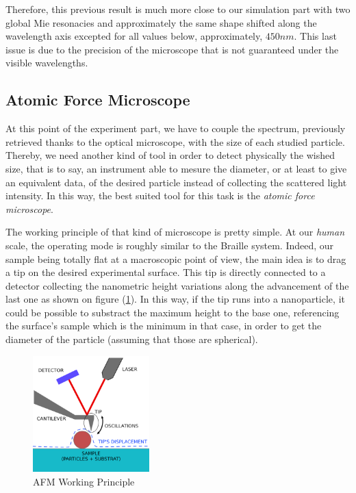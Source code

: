 \documentclass{article}
\numberwithin{equation}{section}
\begin{document}
Therefore, this previous result is much more close to our simulation part with two global Mie resonacies and approximately the same shape shifted along the wavelength axis excepted for all values below, approximately, $450 nm$. This last issue is due to the precision of the microscope that is not guaranteed under the visible wavelengths.

\subsection{Atomic Force Microscope}

At this point of the experiment part, we have to couple the spectrum, previously retrieved thanks to the optical microscope, with the size of each studied particle. Thereby, we need another kind of tool in order to detect physically the wished size, that is to say, an instrument able to mesure the diameter, or at least to give an equivalent data, of the desired particle instead of collecting the scattered light intensity. In this way, the best suited tool for this task is the \textit{atomic force microscope}.

The working principle of that kind of microscope is pretty simple. At our \textit{human} scale, the operating mode is roughly similar to the Braille system. Indeed, our sample being totally flat at a macroscopic point of view, the main idea is to drag a tip on the desired experimental surface. This tip is directly connected to a detector collecting the nanometric height variations along the advancement of the last one as shown on figure (\ref{fig:afm_working_principle}). In this way, if the tip runs into a nanoparticle, it could be possible to substract the maximum height to the base one, referencing the surface's sample which is the minimum in that case, in order to get the diameter of the particle (assuming that those are spherical).
\begin{figure}[h]
    \centering
    \includegraphics[width=0.4\textwidth, height=0.4\textwidth]{afm_working_principle.png}
    \caption{AFM Working Principle}
    \label{fig:afm_working_principle}
\end{figure}
\end{document}
